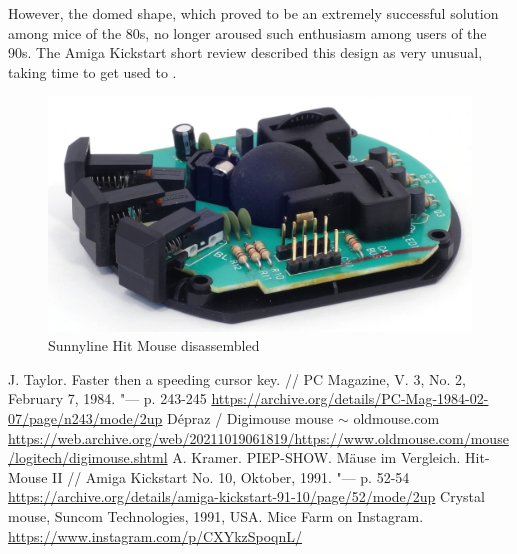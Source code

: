 \documentclass[11pt, a4paper]{article}
\begin{document}
However, the domed shape, which proved to be an extremely successful solution among mice of the 80s, no longer aroused such enthusiasm among users of the 90s. The Amiga Kickstart short review described this design as very unusual, taking time to get used to \cite{sunnyline}.

 \begin{figure}[h]
    \centering
    \includegraphics[scale=0.7]{1982_depraz_digimouse/hitmouse_inside_30.jpg}
    \caption{Sunnyline Hit Mouse disassembled}
    \label{fig:HitMouseInside}
\end{figure}

\begin{thebibliography}{9}
 J. Taylor. Faster then a speeding cursor key. // PC Magazine, V. 3, No. 2, February 7, 1984. "--- p. 243-245 \url{https://archive.org/details/PC-Mag-1984-02-07/page/n243/mode/2up}
 D\'epraz / Digimouse mouse $\sim$ oldmouse.com \url{https://web.archive.org/web/20211019061819/https://www.oldmouse.com/mouse/logitech/digimouse.shtml}
 A. Kramer. PIEP-SHOW. M\"ause im Vergleich. Hit-Mouse II // Amiga Kickstart No. 10, Oktober, 1991. "--- p. 52-54 \url{https://archive.org/details/amiga-kickstart-91-10/page/52/mode/2up}
 Crystal mouse, Suncom Technologies, 1991, USA. Mice Farm on Instagram. \url{https://www.instagram.com/p/CXYkzSpoqnL/}
\end{thebibliography}
\end{document}

